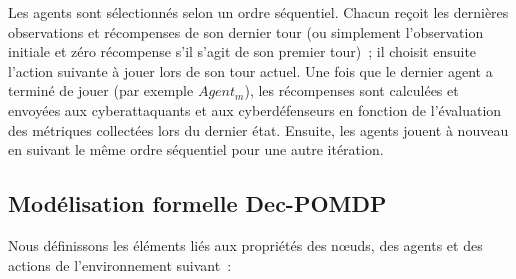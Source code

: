 \noindent
Les agents sont sélectionnés selon un ordre séquentiel. Chacun reçoit les dernières observations et récompenses de son dernier tour (ou simplement l'observation initiale et zéro récompense s'il s'agit de son premier tour)~; il choisit ensuite l'action suivante à jouer lors de son tour actuel. Une fois que le dernier agent a terminé de jouer (par exemple $Agent_m$), les récompenses sont calculées et envoyées aux cyberattaquants et aux cyberdéfenseurs en fonction de l'évaluation des métriques collectées lors du dernier état. Ensuite, les agents jouent à nouveau en suivant le même ordre séquentiel pour une autre itération.


\subsection{Modélisation formelle Dec-POMDP}

Nous définissons les éléments liés aux propriétés des nœuds, des agents et des actions de l'environnement suivant~:

